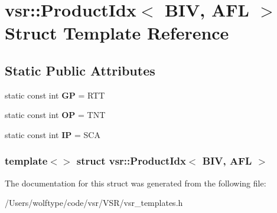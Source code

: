 \hypertarget{structvsr_1_1_product_idx_3_01_b_i_v_00_01_a_f_l_01_4}{\section{vsr\-:\-:Product\-Idx$<$ B\-I\-V, A\-F\-L $>$ Struct Template Reference}
\label{structvsr_1_1_product_idx_3_01_b_i_v_00_01_a_f_l_01_4}
}
\subsection*{Static Public Attributes}
\begin{DoxyCompactItemize}
\item 
\hypertarget{structvsr_1_1_product_idx_3_01_b_i_v_00_01_a_f_l_01_4_a885c7c5408a35fc2183fca09a4243da0}{static const int {\bfseries G\-P} = R\-T\-T}\label{structvsr_1_1_product_idx_3_01_b_i_v_00_01_a_f_l_01_4_a885c7c5408a35fc2183fca09a4243da0}

\item 
\hypertarget{structvsr_1_1_product_idx_3_01_b_i_v_00_01_a_f_l_01_4_a10a628474f3135d9a0681443a3629d9f}{static const int {\bfseries O\-P} = T\-N\-T}\label{structvsr_1_1_product_idx_3_01_b_i_v_00_01_a_f_l_01_4_a10a628474f3135d9a0681443a3629d9f}

\item 
\hypertarget{structvsr_1_1_product_idx_3_01_b_i_v_00_01_a_f_l_01_4_a2953f12d41b791299324cdd582bc10cc}{static const int {\bfseries I\-P} = S\-C\-A}\label{structvsr_1_1_product_idx_3_01_b_i_v_00_01_a_f_l_01_4_a2953f12d41b791299324cdd582bc10cc}

\end{DoxyCompactItemize}
\subsubsection*{template$<$$>$ struct vsr\-::\-Product\-Idx$<$ B\-I\-V, A\-F\-L $>$}



The documentation for this struct was generated from the following file\-:\begin{DoxyCompactItemize}
\item 
/\-Users/wolftype/code/vsr/\-V\-S\-R/vsr\-\_\-templates.\-h\end{DoxyCompactItemize}
